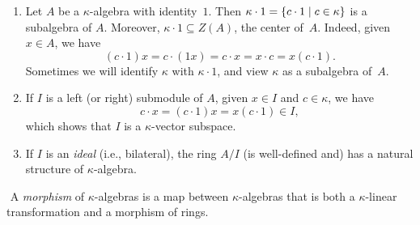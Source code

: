 \begin{rems}${}$
    \begin{enumerate}[-]
        \item Let $A$ be a $\kappa$-algebra with identity~$1$. Then $\kappa\cdot1 = \{c\cdot1\mid c\in\kappa\}$ is a subalgebra of $A$. Moreover, $\kappa\cdot1\subseteq Z(A)$, the center of~$A$. Indeed, given $x\in A$, we have
        $$
            (c\cdot1)x = c\cdot(1x) = c\cdot x
                = x\cdot c = x(c\cdot1).
        $$
        Sometimes we will identify $\kappa$ with $\kappa\cdot1$, and view $\kappa$ as a subalgebra of~$A$.

        \item If $I$ is a left (or right) submodule of $A$, given $x\in I$ and $c\in \kappa$, we have
        $$
            c\cdot x = (c\cdot1)x = x(c\cdot1)\in I,
        $$
        which shows that $I$ is a $\kappa$-vector subspace.

        \item If $I$ is an \textsl{ideal} (i.e., bilateral), the ring $A/I$ (is well-defined and) has a natural structure of $\kappa$-algebra. 
    \end{enumerate}

\end{rems}

\begin{defn}${}$
    A \textsl{morphism} of $\kappa$-algebras is a map between $\kappa$-algebras that is both a $\kappa$-linear transformation and a morphism of rings.
\end{defn}

